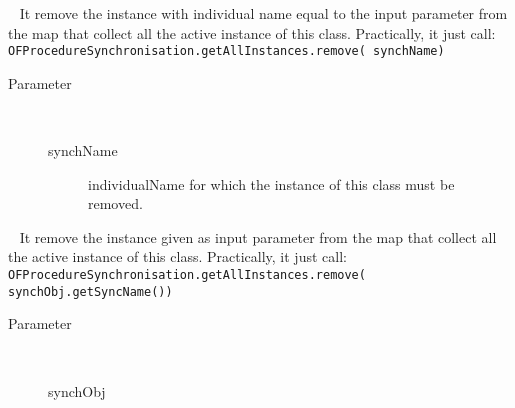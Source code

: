 \begin{description}
~ It remove the instance with individual name equal to the input
 parameter from the map that collect all the active instance of
 this class. Practically, it just call:
 \verb!OFProcedureSynchronisation.getAllInstances.remove( synchName)!
\begin{description}
\item[Parameter] ~
\begin{description}
\item[synchName]
individualName for which the instance of this 
 class must be removed.
\end{description}
\end{description}
\item[{\ltdHypertarget{ontologyFramework.OFProcedureManagment.OFProcedureSynchronisation.removeSynchronisation(ontologyFramework.OFProcedureManagment.OFProcedureSynchronisation)}{removeSynchronisation}\label{ontologyFramework.OFProcedureManagment.OFProcedureSynchronisation.removeSynchronisation(ontologyFramework.OFProcedureManagment.OFProcedureSynchronisation)}}]
~ It remove the instance given as input parameter
 from the map that collect all the active instance of
 this class. Practically, it just call:
 \verb!OFProcedureSynchronisation.getAllInstances.remove( synchObj.getSyncName())!
\begin{description}
\item[Parameter] ~
\begin{description}
\item[synchObj]

\end{description}
\end{description}
\end{description}
